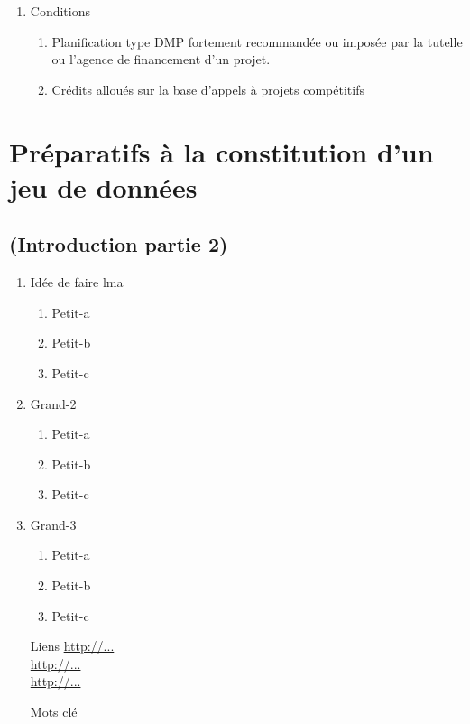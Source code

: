 \documentclass{book}
\begin{document}
\begin{enumerate}
	\item Conditions
	      \begin{enumerate}
	      	\item Planification type DMP fortement recommandée ou imposée par la tutelle ou l'agence de financement d'un projet.
            \item Crédits alloués sur la base d'appels à projets compétitifs
            
	      \end{enumerate}
\end{enumerate}

\chapter{Préparatifs à la constitution d'un jeu de données}

\section*{(Introduction partie 2)}

\begin{enumerate}
	\item Idée de faire lma 
        \begin{enumerate}
            \item Petit-a
            \item Petit-b
            \item Petit-c
        \end{enumerate}
	\item Grand-2
        \begin{enumerate}
            \item Petit-a
            \item Petit-b
            \item Petit-c
        \end{enumerate}
	\item Grand-3
        \begin{enumerate}
            \item Petit-a
            \item Petit-b
            \item Petit-c
        \end{enumerate}
\end{enumerate}

\begin{itemize}
    \item [Liens]
        \url{http://...}\\
        \url{http://...}\\
        \url{http://...}\\
    \item [Mots clé]
\end{itemize}
\end{document}

